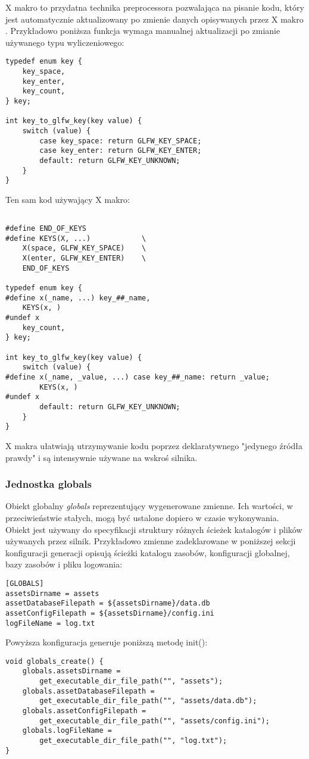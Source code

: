 X makro to przydatna technika preprocessora pozwalająca na pisanie kodu, który jest automatycznie aktualizowany po zmienie danych opisywanych przez X makro \cite{XMACRO}.
Przykładowo poniższa funkcja wymaga manualnej aktualizacji po zmianie używanego typu wyliczeniowego:
\lstset{language=C}
\begin{lstlisting}
typedef enum key {
	key_space,
	key_enter,
	key_count,
} key;

int key_to_glfw_key(key value) {
	switch (value) {
		case key_space: return GLFW_KEY_SPACE;
		case key_enter: return GLFW_KEY_ENTER;
		default: return GLFW_KEY_UNKNOWN;
	}
}
\end{lstlisting}
Ten sam kod używający X makro:
\lstset{language=C}
\begin{lstlisting}

#define END_OF_KEYS
#define KEYS(X, ...)			\
	X(space, GLFW_KEY_SPACE)	\
	X(enter, GLFW_KEY_ENTER)	\
	END_OF_KEYS

typedef enum key {
#define x(_name, ...) key_##_name,
	KEYS(x, )
#undef x
	key_count,
} key;

int key_to_glfw_key(key value) {
	switch (value) {
#define x(_name, _value, ...) case key_##_name: return _value;
		KEYS(x, )
#undef x
		default: return GLFW_KEY_UNKNOWN;
	}
}
\end{lstlisting}
X makra ułatwiają utrzymywanie kodu poprzez deklaratywnego "jedynego źródła prawdy" i są intensywnie używane na wskroś silnika.

\subsubsection{Jednostka globals}
Obiekt globalny \textit{globals} reprezentujący wygenerowane zmienne.
Ich wartości, w przeciwieństwie stałych, mogą być ustalone dopiero w czasie wykonywania.
Obiekt jest używany do specyfikacji struktury różnych ścieżek katalogów i plików używanych przez silnik.
Przykładowo zmienne zadeklarowane w poniższej sekcji konfiguracji generacji opisują ścieżki katalogu zasobów, konfiguracji globalnej, bazy zasobów i pliku logowania:
\begin{verbatim}
[GLOBALS]
assetsDirname = assets
assetDatabaseFilepath = ${assetsDirname}/data.db
assetConfigFilepath = ${assetsDirname}/config.ini
logFileName = log.txt
\end{verbatim}
Powyższa konfiguracja generuje poniższą metodę init():
\lstset{language=C}
\begin{lstlisting}
void globals_create() {
	globals.assetsDirname =
		get_executable_dir_file_path("", "assets");
	globals.assetDatabaseFilepath =
		get_executable_dir_file_path("", "assets/data.db");
	globals.assetConfigFilepath =
		get_executable_dir_file_path("", "assets/config.ini");
	globals.logFileName =
		get_executable_dir_file_path("", "log.txt");
}
\end{lstlisting}

